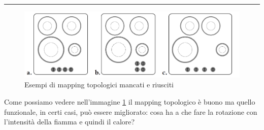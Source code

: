 \documentclass[11pt,a4paper]{book}
\begin{document}
\noindent\rule{\textwidth}{1pt}
\begin{figure}[h!]
	\begin{center}
		\includegraphics[scale=0.2]{img/006.png}
		\caption{Esempi di mapping topologici mancati e riusciti}
		\label{fig: 006}
	\end{center}
\end{figure}
Come possiamo vedere nell'immagine \ref{fig: 006} il mapping topologico è buono ma quello funzionale, in certi casi, può essere migliorato: cosa ha a che fare la rotazione con l'intensità della fiamma e quindi il calore?
\end{document}
